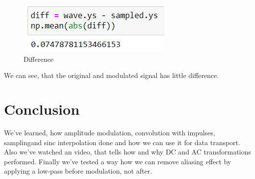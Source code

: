 \documentclass[a4paper]{article}
\begin{document}
        \begin{figure}[H]
            \centering
            \includegraphics[width=\textwidth]{img/p2_5.png}
            \caption{Difference}
            \label{fig:part1_1_2}
        \end{figure}
        
        We can see, that the original and modulated signal has little difference.
            
    \newpage
        \section{Conclusion}
            We've learned, how amplitude modulation, convolution with impulses, samplingand sinc interpolation done and how we can use it for data transport. Also we've watched an video, that tells how and why DC and AC transformations performed. Finally we've tested a way how we can remove aliasing effect by applying a low-pass before modulation, not after.
     
\end{document}
